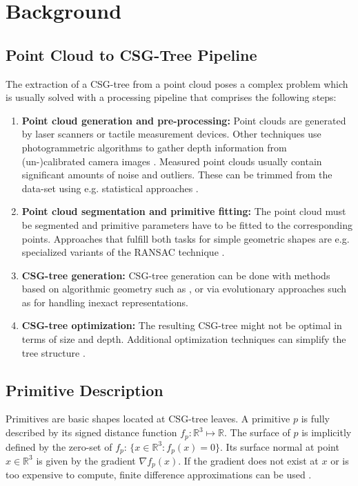 \section{Background}
\label{sec:back}
\subsection{Point Cloud to \ac{CSG}-Tree Pipeline} 
The extraction of a \ac{CSG}-tree from a point cloud poses a complex problem which is usually solved with a processing pipeline that comprises the following steps:  
\begin{enumerate}
\item \textbf{Point cloud generation and pre-processing:} Point clouds are generated by laser scanners or tactile measurement devices. 
Other techniques use photogrammetric algorithms to gather depth information from (un-)calibrated camera images \cite{hartley2003multiple}.
Measured point clouds usually contain significant amounts of noise and outliers. 
These can be trimmed from the data-set using e.g. statistical approaches  \cite{rusu20113d}.
\item \textbf{Point cloud segmentation and primitive fitting:} The point cloud must be segmented and primitive parameters have to be fitted to the corresponding points. Approaches that fulfill both tasks for simple geometric shapes are e.g. specialized variants of the \ac{RANSAC} technique \cite{schnabel2007efficient}.
\item \textbf{\ac{CSG}-tree generation:} \ac{CSG}-tree generation can be done with methods based on algorithmic geometry such as \cite{shapiro1993separation, buchele2004three}, or via evolutionary approaches such as \cite{fayolle2016evolutionary} for handling inexact representations.
\item \textbf {\ac{CSG}-tree optimization:} The resulting \ac{CSG}-tree might not be optimal in terms of size and depth.
Additional optimization techniques can simplify the tree structure \cite{shapiro1991construction}. 
\end{enumerate}
\subsection{Primitive Description}
Primitives are basic shapes located at \ac{CSG}-tree leaves. 
A primitive $p$ is fully described by its signed distance function $f_p: \mathbb{R}^3 \mapsto \mathbb{R}$.
The surface of $p$ is implicitly defined by the zero-set of $f_p$: $\{x \in \mathbb{R}^3 : f_p(x)=0\}$.
Its surface normal at point $x \in \mathbb{R}^3$ is given by the gradient $\nabla f_p(x)$.
If the gradient does not exist at $x$ or is too expensive to compute, finite difference approximations can be used \cite{olver2014introduction}.

